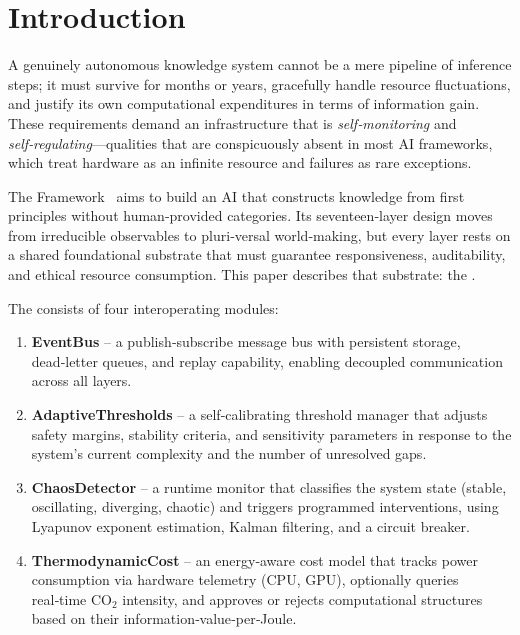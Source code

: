 \section{Introduction}

A genuinely autonomous knowledge system cannot be a mere pipeline of
inference steps; it must survive for months or years, gracefully handle
resource fluctuations, and justify its own computational expenditures in
terms of information gain.  These requirements demand an infrastructure
that is \emph{self‑monitoring} and \emph{self‑regulating}---qualities
that are conspicuously absent in most AI frameworks, which treat hardware
as an infinite resource and failures as rare exceptions.

The \Apeiron{} Framework~\cite{beniers2026apeiron} aims to build an AI
that constructs knowledge from first principles without human‑provided
categories.  Its seventeen‑layer design moves from irreducible observables
to pluri‑versal world‑making, but every layer rests on a shared
foundational substrate that must guarantee responsiveness, auditability, and
ethical resource consumption.  This paper describes that substrate: the
\Core{}.

The \Core{} consists of four interoperating modules:
\begin{enumerate}
    \item \textbf{EventBus} -- a publish‑subscribe message bus with
          persistent storage, dead‑letter queues, and replay capability,
          enabling decoupled communication across all layers.
    \item \textbf{AdaptiveThresholds} -- a self‑calibrating threshold
          manager that adjusts safety margins, stability criteria, and
          sensitivity parameters in response to the system's current
          complexity and the number of unresolved gaps.
    \item \textbf{ChaosDetector} -- a runtime monitor that classifies the
          system state (stable, oscillating, diverging, chaotic) and triggers
          programmed interventions, using Lyapunov exponent estimation,
          Kalman filtering, and a circuit breaker.
    \item \textbf{ThermodynamicCost} -- an energy‑aware cost model that
          tracks power consumption via hardware telemetry (CPU, GPU),
          optionally queries real‑time CO\(_2\) intensity, and approves
          or rejects computational structures based on their
          information‑value‑per‑Joule.
\end{enumerate}

